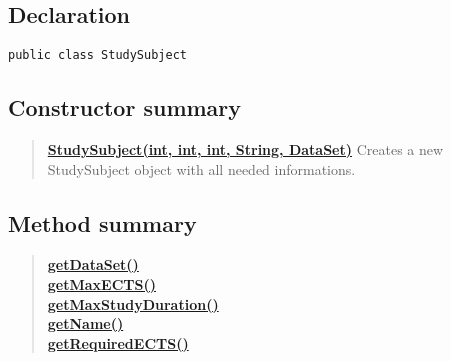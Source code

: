 \documentclass[11pt,a4paper]{report}
\begin{document}
{{{{{{{{{{{{{			\subsection{Declaration}{
				\begin{lstlisting}[frame=none]
public class StudySubject
				\end{lstlisting}
			}
			
			\subsection{Constructor summary}{
				\begin{verse}
					\hyperlink{studyplanning.model.workflow.StudySubject(int, int, int, java.lang.String, studyplanning.model.workflow.DataSet)}{{\bf StudySubject(int, int, int, String, DataSet)}} Creates a new StudySubject object with all needed informations.\\
				\end{verse}
			}
	
			\subsection{Method summary}{
				\begin{verse}
					\hyperlink{studyplanning.model.workflow.StudySubject.getDataSet()}{{\bf getDataSet()}} \\
					\hyperlink{studyplanning.model.workflow.StudySubject.getMaxECTS()}{{\bf getMaxECTS()}} \\
					\hyperlink{studyplanning.model.workflow.StudySubject.getMaxStudyDuration()}{{\bf getMaxStudyDuration()}} \\
					\hyperlink{studyplanning.model.workflow.StudySubject.getName()}{{\bf getName()}} \\
					\hyperlink{studyplanning.model.workflow.StudySubject.getRequiredECTS()}{{\bf getRequiredECTS()}} \\
				\end{verse}
			}
			
}}}}}}}}}}}}}
\end{document}
